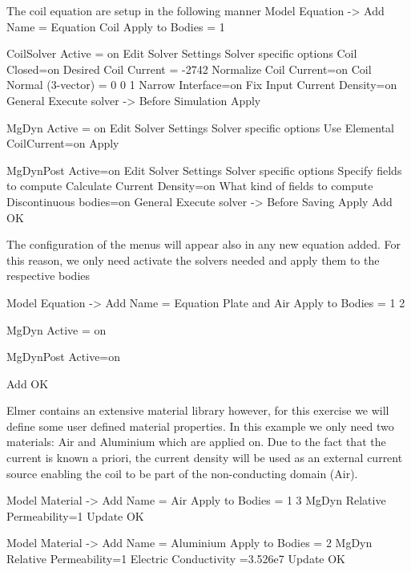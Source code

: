 The coil equation are setup in the following manner
\ttbegin
Model
  Equation -> Add
     Name = Equation Coil
     Apply to Bodies = 1
     
     CoilSolver
         Active = on 
         Edit Solver Settings
             Solver specific options
                 Coil Closed=on
                 Desired Coil Current =  -2742
                 Normalize Coil Current=on
                 Coil Normal (3-vector) = 0 0 1
                 Narrow Interface=on
                 Fix Input Current Density=on
             General
                 Execute solver -> Before Simulation
             Apply
             
     MgDyn
         Active = on
         Edit Solver Settings
             Solver specific options
                 Use Elemental CoilCurrent=on
             Apply
         
     MgDynPost
         Active=on
         Edit Solver Settings
             Solver specific options
                 Specify fields to compute
                     Calculate Current Density=on
                 What kind of fields to compute
                     Discontinuous bodies=on
             General
                 Execute solver -> Before Saving
              Apply
    Add 
    OK
\ttend       


\clearpage
The configuration of the menus will appear also in any new equation added.  For this reason,  we only need activate the solvers needed and apply them to the respective bodies

\ttbegin
Model
  Equation -> Add
     Name = Equation Plate and Air
     Apply to Bodies = 1 2
     
     MgDyn
         Active = on
         
     MgDynPost
         Active=on
         
    Add 
    OK
\ttend  

 
Elmer contains an extensive material library however, for this exercise we will define some user defined material properties.  In this example we only need two materials: Air and Aluminium which are applied on. Due to the fact that the current is known a priori, the current density will be used as an external current source enabling the coil to be part of the non-conducting domain (Air).

\ttbegin
Model
  Material -> Add
      Name = Air
      Apply to Bodies = 1 3
      MgDyn
          Relative Permeability=1
    Update
    OK
\ttend


\ttbegin
Model
  Material -> Add
      Name = Aluminium
      Apply to Bodies = 2
      MgDyn
          Relative Permeability=1
          Electric Conductivity =3.526e7
    Update
    OK
\ttend

